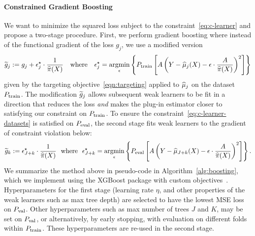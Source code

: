  \paragraph{Constrained Gradient Boosting}
We want to minimize the squared loss subject to the constraint~\eqref{eq:c-learner} and propose a two-stage procedure. First, we perform gradient boosting where instead of the functional gradient of the loss $g_j$, we use a modified version 
\vspace{-0.3em}
\begin{align}
    \label{eq:epsilon_xgb}
    \widetilde{g}_{j} := g_{j} + \epsilon^\star_j \cdot \frac{1}{\widehat{\pi}(X)}~~~\mbox{where}~~~
\epsilon_j^\star = \mathop{\rm argmin}_\epsilon 
\left\{ P_{\rm train}\left[A\left(Y-\widehat{\mu}_j(X)-\epsilon \cdot \frac{A}{\widehat{\pi}(X)}\right)^2\right]\right\}
    \end{align}
 given by the targeting objective~\eqref{eqn:targeting} applied to $\widehat{\mu}_j$ on the dataset $P_{\rm train}$. 
The modification $\widetilde{g}_j$ allows subsequent weak learners to be fit in a direction that reduces the loss \emph{and} makes the plug-in estimator closer to satisfying our constraint on $P_{\rm train}$. To ensure the constraint~\eqref{eq:c-learner-datasets} is satisfied on $P_{\rm eval}$, the second stage fits weak learners  to the gradient of constraint violation below:
\vspace{-0.3em}
\begin{equation*}
    \widetilde{g}_k := \epsilon^\star_{J+k} \cdot \frac{1}{\widehat{\pi}(X)}~~\mbox{where}~~
    \epsilon^\star_{J+k} = \mathop{\rm argmin}_{\epsilon} \left\{ P_{\rm eval}\left[A\left(Y-\widehat{\mu}_{J+k}(X)-\epsilon \cdot \frac{A}{ \widehat{\pi}(X)}\right)^2\right]\right\}.
\end{equation*}
We summarize the method above in pseudo-code in Algorithm~\ref{alg:boosting}, which we implement using the XGBoost package with custom objectives~\citep{xgb}. Hyperparameters for the first stage (learning rate $\eta$, and other properties of the weak learners such as max tree depth) are selected to have the lowest MSE loss on $P_{\rm val}$.  Other hyperparameters such as max number of trees $J$ and $K$, may be set on $P_{\rm val}$, or alternatively, by early stopping, with evaluation on different folds within $P_{\rm train}$. 
These hyperparameters are re-used in the second stage. 




